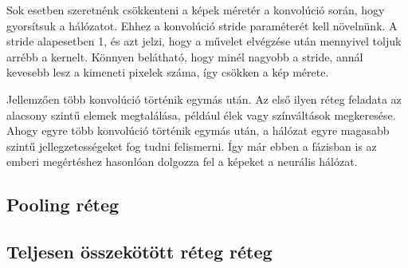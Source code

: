 Sok esetben szeretnénk csökkenteni a képek méretér a konvolúció során, hogy gyorsítsuk a hálózatot. Ehhez a konvolúció stride paraméterét kell növelnünk. A stride alapesetben 1, és azt jelzi, hogy a művelet elvégzése után mennyivel toljuk arrébb a kernelt. Könnyen belátható, hogy minél nagyobb a stride, annál kevesebb lesz a kimeneti pixelek száma, így csökken a kép mérete.

Jellemzően több konvolúció történik egymás után. Az első ilyen réteg feladata az alacsony szintű elemek megtalálása, például élek vagy színváltások megkeresése. Ahogy egyre több konvolúció történik egymás után, a hálózat egyre magasabb szintű jellegzetességeket fog tudni felismerni. Így már ebben a fázisban is az emberi megértéshez hasonlóan dolgozza fel a képeket a neurális hálózat.
\cite{ConvNetExplain}

\subsection{Pooling réteg}

\subsection{Teljesen összekötött réteg réteg}